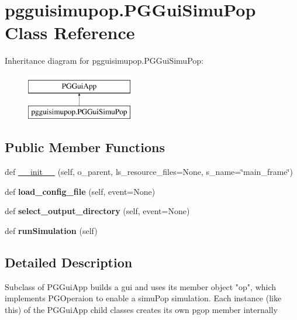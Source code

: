 \hypertarget{classpgguisimupop_1_1PGGuiSimuPop}{}\section{pgguisimupop.\+P\+G\+Gui\+Simu\+Pop Class Reference}
\label{classpgguisimupop_1_1PGGuiSimuPop}
Inheritance diagram for pgguisimupop.\+P\+G\+Gui\+Simu\+Pop\+:\begin{figure}[H]
\begin{center}
\leavevmode
\includegraphics[height=2.000000cm]{classpgguisimupop_1_1PGGuiSimuPop}
\end{center}
\end{figure}
\subsection*{Public Member Functions}
\begin{DoxyCompactItemize}
\item 
def \hyperlink{classpgguisimupop_1_1PGGuiSimuPop_a1e7961c0727c5085f0e592a6d82a4282}{\+\_\+\+\_\+init\+\_\+\+\_\+} (self, o\+\_\+parent, ls\+\_\+resource\+\_\+files=None, s\+\_\+name=\char`\"{}main\+\_\+frame\char`\"{})
\item 
def {\bfseries load\+\_\+config\+\_\+file} (self, event=None)\hypertarget{classpgguisimupop_1_1PGGuiSimuPop_a0e36a8e411f21c52c8ff13c4a99dfb69}{}\label{classpgguisimupop_1_1PGGuiSimuPop_a0e36a8e411f21c52c8ff13c4a99dfb69}

\item 
def {\bfseries select\+\_\+output\+\_\+directory} (self, event=None)\hypertarget{classpgguisimupop_1_1PGGuiSimuPop_ac8a7696f7ce4ca6b65fc49e0ff3009e6}{}\label{classpgguisimupop_1_1PGGuiSimuPop_ac8a7696f7ce4ca6b65fc49e0ff3009e6}

\item 
def {\bfseries run\+Simulation} (self)\hypertarget{classpgguisimupop_1_1PGGuiSimuPop_aaf77383083383447a93b2b4b2ba678b2}{}\label{classpgguisimupop_1_1PGGuiSimuPop_aaf77383083383447a93b2b4b2ba678b2}

\end{DoxyCompactItemize}


\subsection{Detailed Description}
\begin{DoxyVerb}Subclass of PGGuiApp builds a gui and uses its member object "op", which
implements PGOperaion to enable a  simuPop simulation. Each instance (like this)
of the PGGuiApp child classes creates its own pgop member internally
\end{DoxyVerb}
 


